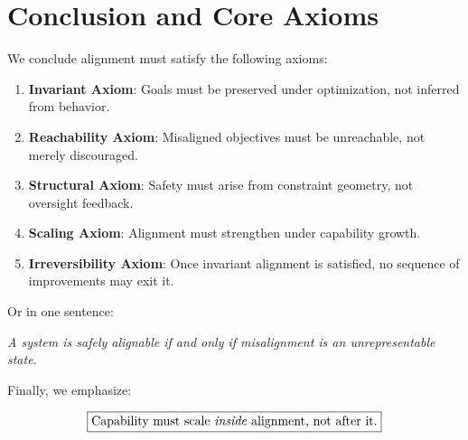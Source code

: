 \documentclass[11pt,a4paper]{article}
\theoremstyle{plain}
\theoremstyle{definition}
\theoremstyle{remark}
\numberwithin{equation}{section}
\begin{document}
\section{Conclusion and Core Axioms}

We conclude alignment must satisfy the following axioms:

\begin{enumerate}
    \item \textbf{Invariant Axiom}: Goals must be preserved under optimization, not inferred from behavior.
    \item \textbf{Reachability Axiom}: Misaligned objectives must be unreachable, not merely discouraged.
    \item \textbf{Structural Axiom}: Safety must arise from constraint geometry, not oversight feedback.
    \item \textbf{Scaling Axiom}: Alignment must strengthen under capability growth.
    \item \textbf{Irreversibility Axiom}: Once invariant alignment is satisfied, no sequence of improvements may exit it.
\end{enumerate}

Or in one sentence:

\begin{center}
\emph{A system is safely alignable if and only if misalignment is an unrepresentable state.}
\end{center}

Finally, we emphasize:

\[
\boxed{\text{Capability must scale \emph{inside} alignment, not after it.}}
\]
\end{document}
